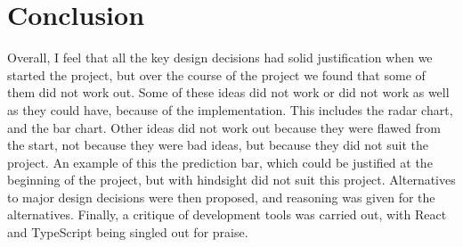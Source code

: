 \documentclass[10pt, journal]{IEEEtran}
\begin{document}
\section{Conclusion}
Overall, I feel that all the key design decisions had solid justification when we started the project, but over the course of the project we found that some of them did not work out. Some of these ideas did not work or did not work as well as they could have, because of the implementation. This includes the radar chart, and the bar chart. Other ideas did not work out because they were flawed from the start, not because they were bad ideas, but because they did not suit the project. An example of this the prediction bar, which could be justified at the beginning of the project, but with hindsight did not suit this project. Alternatives to major design decisions were then proposed, and reasoning was given for the alternatives. Finally, a critique of development tools was carried out, with React and TypeScript  being singled out for praise.




\end{document}
